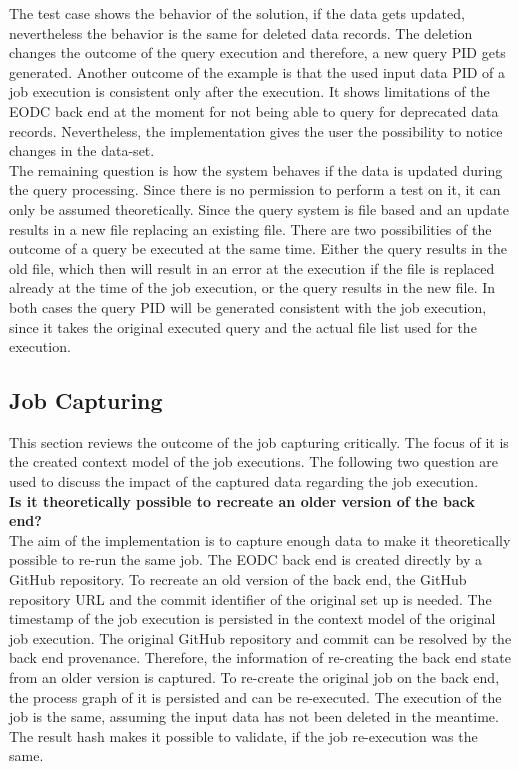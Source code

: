\documentclass[draft,final]{vutinfth} %
\begin{document}
The test case shows the behavior of the solution, if the data gets updated, nevertheless the behavior is the same for deleted data records. The deletion changes the outcome of the query execution and therefore, a new query PID gets generated. Another outcome of the example is that the used input data PID of a job execution is consistent only after the execution. It shows limitations of the EODC back end at the moment for not being able to query for deprecated data records. Nevertheless, the implementation gives the user the possibility to notice changes in the data-set. \\
The remaining question is how the system behaves if the data is updated during the query processing. Since there is no permission to perform a test on it, it can only be assumed theoretically. Since the query system is file based and an update results in a new file replacing an existing file. There are two possibilities of the outcome of a query be executed at the same time. Either the query results in the old file, which then will result in an error at the execution if the file is replaced already at the time of the job execution, or the query results in the new file. In both cases the query PID will be generated consistent with the job execution, since it takes the original executed query and the actual file list used for the execution.     

\subsection{Job Capturing}\label{Evaluation:special_jobcap}

This section reviews the outcome of the job capturing critically. The focus of it is the created context model of the job executions. The following two question are used to discuss the impact of the captured data regarding the job execution.  \\

\textbf{Is it theoretically possible to recreate an older version of the back end?} \\
The aim of the implementation is to capture enough data to make it theoretically possible to re-run the same job. The EODC back end is created directly by a GitHub repository. To recreate an old version of the back end, the GitHub repository URL and the commit identifier of the original set up is needed. The timestamp of the job execution is persisted in the context model of the original job execution. The original GitHub repository and commit can be resolved by the back end provenance. Therefore, the information of re-creating the back end state from an older version is captured. To re-create the original job on the back end, the process graph of it is persisted and can be re-executed. The execution of the job is the same, assuming the input data has not been deleted in the meantime. The result hash makes it possible to validate, if the job re-execution was the same.
\end{document}

